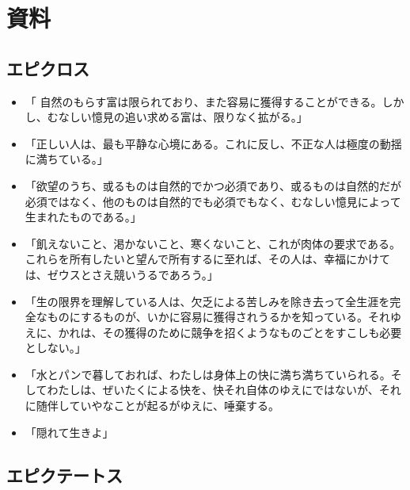 \documentclass[uplatex,dvipdfmx]{jsarticle} \usepackage{mystyle}%
\begin{document}
\section{資料}



\subsection{エピクロス }

    \begin{itemize}
    \item 「 自然のもらす富は限られており、また容易に獲得することができる。しかし、むなしい憶見の追い求める富は、限りなく拡がる。」 %

    \item 「正しい人は、最も平静な心境にある。これに反し、不正な人は極度の動揺に満ちている。」

    \item 「欲望のうち、或るものは自然的でかつ必須であり、或るものは自然的だが必須ではなく、他のものは自然的でも必須でもなく、むなしい憶見によって生まれたものである。」


    \item 「飢えないこと、渇かないこと、寒くないこと、これが肉体の要求である。これらを所有したいと望んで所有するに至れば、その人は、幸福にかけては、ゼウスとさえ競いうるであろう。」

    \item 「生の限界を理解している人は、欠乏による苦しみを除き去って全生涯を完全なものにするものが、いかに容易に獲得されうるかを知っている。それゆえに、かれは、その獲得のために競争を招くようなものごとをすこしも必要としない。」

    \item 「水とパンで暮しておれば、わたしは身体上の快に満ち満ちていられる。そしてわたしは、ぜいたくによる快を、快それ自体のゆえにではないが、それに随伴していやなことが起るがゆえに、唾棄する。

    \item 「隠れて生きよ」
    \end{itemize}




\subsection*{エピクテートス}
\end{document}
